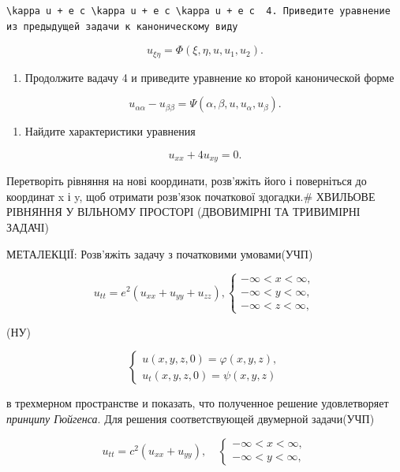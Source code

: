 \documentclass[
  ukrainian,
]{article}
\providecommand{\tightlist}{%
  \setlength{\itemsep}{0pt}\setlength{\parskip}{0pt}}
\begin{document}
\begin{verbatim}
\kappa u + e c \kappa u + e c \kappa u + e c  4. Приведите уравнение из предыдущей задачи к каноническому виду
\end{verbatim}

\[
u_{\xi\eta} = \Phi(\xi, \eta, u, u_1, u_2).
\]

\begin{enumerate}
\def\labelenumi{\arabic{enumi}.}
\setcounter{enumi}{4}
\tightlist
\item
  Продолжите вадачу 4 и приведите уравнение ко второй канонической форме
\end{enumerate}

\[
u_{\alpha\alpha} - u_{\beta\beta} = \Psi(\alpha, \beta, u, u_{\alpha}, u_{\beta}).
\]

\begin{enumerate}
\def\labelenumi{\arabic{enumi}.}
\setcounter{enumi}{5}
\tightlist
\item
  Найдите характеристики уравнения
\end{enumerate}

\[
u_{xx} + 4u_{xy} = 0.
\]

Перетворіть рівняння на нові координати, розв'яжіть його і поверніться
до координат x і y, щоб отримати розв'язок початкової здогадки.\#
ХВИЛЬОВЕ РІВНЯННЯ У ВІЛЬНОМУ ПРОСТОРІ (ДВОВИМІРНІ ТА ТРИВИМІРНІ ЗАДАЧІ)

МЕТАЛЕКЦІЇ: Розв'яжіть задачу з початковими умовами(УЧП)

\[
u_{tt} = e^{2} (u_{xx} + u_{yy} + u_{zz}),
\begin{cases} -\infty < x < \infty, \\ -\infty < y < \infty, \\ -\infty < z < \infty, \end{cases}
\]

(НУ)

\[
\begin{cases} u(x, y, z, 0) = \varphi(x, y, z), \\ u_{t}(x, y, z, 0) = \psi(x, y, z) \end{cases}
\]

в трехмерном пространстве и показать, что полученное решение
удовлетворяет \emph{принципу Гюйгенса}. Для решения соответствующей
двумерной задачи(УЧП)

\[
u_{tt} = c^2 (u_{xx} + u_{yy}), \quad
\begin{cases} -\infty < x < \infty, \\ -\infty < y < \infty, \end{cases}
\]
\end{document}
